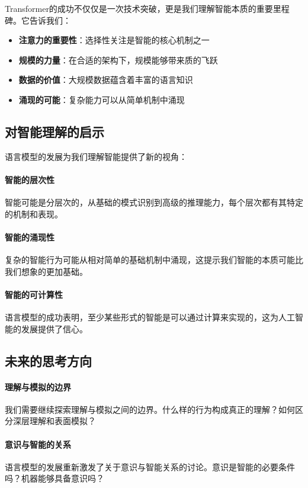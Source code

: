 Transformer的成功不仅仅是一次技术突破，更是我们理解智能本质的重要里程碑。它告诉我们：

\begin{itemize}
\item \textbf{注意力的重要性}：选择性关注是智能的核心机制之一
\item \textbf{规模的力量}：在合适的架构下，规模能够带来质的飞跃
\item \textbf{数据的价值}：大规模数据蕴含着丰富的语言知识
\item \textbf{涌现的可能}：复杂能力可以从简单机制中涌现
\end{itemize}

\subsection{对智能理解的启示}

语言模型的发展为我们理解智能提供了新的视角：

\paragraph{智能的层次性}
智能可能是分层次的，从基础的模式识别到高级的推理能力，每个层次都有其特定的机制和表现。

\paragraph{智能的涌现性}
复杂的智能行为可能从相对简单的基础机制中涌现，这提示我们智能的本质可能比我们想象的更加基础。

\paragraph{智能的可计算性}
语言模型的成功表明，至少某些形式的智能是可以通过计算来实现的，这为人工智能的发展提供了信心。

\subsection{未来的思考方向}

\paragraph{理解与模拟的边界}
我们需要继续探索理解与模拟之间的边界。什么样的行为构成真正的理解？如何区分深层理解和表面模拟？

\paragraph{意识与智能的关系}
语言模型的发展重新激发了关于意识与智能关系的讨论。意识是智能的必要条件吗？机器能够具备意识吗？

